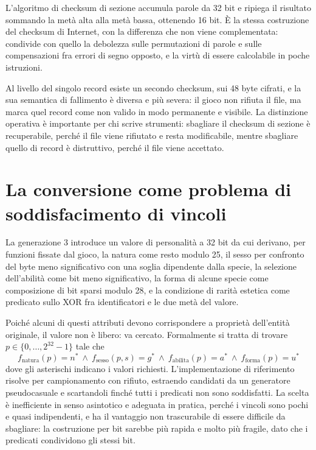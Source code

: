 \documentclass[11pt,a4paper]{article}
\begin{document}
L'algoritmo di checksum di sezione accumula parole da 32 bit e ripiega il risultato sommando la metà alta alla metà bassa, ottenendo 16 bit. È la stessa costruzione del checksum di Internet, con la differenza che non viene complementata: condivide con quello la debolezza sulle permutazioni di parole e sulle compensazioni fra errori di segno opposto, e la virtù di essere calcolabile in poche istruzioni.

Al livello del singolo record esiste un secondo checksum, sui 48 byte cifrati, e la sua semantica di fallimento è diversa e più severa: il gioco non rifiuta il file, ma marca quel record come non valido in modo permanente e visibile. La distinzione operativa è importante per chi scrive strumenti: sbagliare il checksum di sezione è recuperabile, perché il file viene rifiutato e resta modificabile, mentre sbagliare quello di record è distruttivo, perché il file viene accettato.

\section{La conversione come problema di soddisfacimento di vincoli}

La generazione 3 introduce un valore di personalità a 32 bit da cui derivano, per funzioni fissate dal gioco, la natura come resto modulo 25, il sesso per confronto del byte meno significativo con una soglia dipendente dalla specie, la selezione dell'abilità come bit meno significativo, la forma di alcune specie come composizione di bit sparsi modulo 28, e la condizione di rarità estetica come predicato sullo XOR fra identificatori e le due metà del valore.

Poiché alcuni di questi attributi devono corrispondere a proprietà dell'entità originale, il valore non è libero: va cercato. Formalmente si tratta di trovare $p \in \{0,\dots,2^{32}-1\}$ tale che
\begin{equation}
f_{\text{natura}}(p) = n^{*} \ \wedge\ f_{\text{sesso}}(p, s) = g^{*} \ \wedge\ f_{\text{abilita}}(p) = a^{*} \ \wedge\ f_{\text{forma}}(p) = u^{*}
\end{equation}
dove gli asterischi indicano i valori richiesti. L'implementazione di riferimento risolve per campionamento con rifiuto, estraendo candidati da un generatore pseudocasuale e scartandoli finché tutti i predicati non sono soddisfatti. La scelta è inefficiente in senso asintotico e adeguata in pratica, perché i vincoli sono pochi e quasi indipendenti, e ha il vantaggio non trascurabile di essere difficile da sbagliare: la costruzione per bit sarebbe più rapida e molto più fragile, dato che i predicati condividono gli stessi bit.
\end{document}
